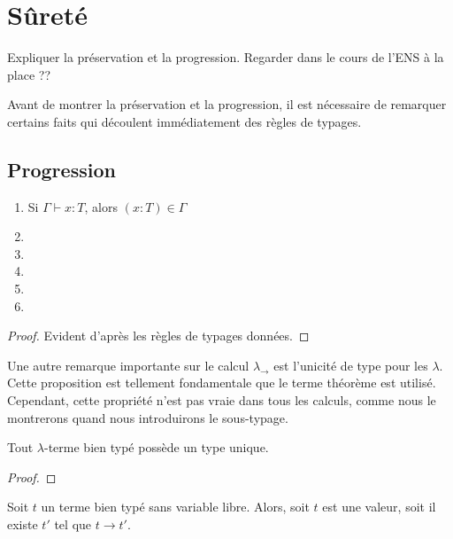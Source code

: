 \section{Sûreté}

Expliquer la préservation et la progression.
Regarder dans le cours de l'ENS à la place ??

Avant de montrer la préservation et la progression, il est nécessaire de
remarquer certains faits qui découlent immédiatement des règles de typages.

\subsection*{Progression}

\begin{lemma} 
  \begin{enumerate}
    \item Si $\Gamma \vdash x : T$, alors $(x : T) \in \Gamma$
    \item 
    \item 
    \item 
    \item 
    \item 
  \end{enumerate}
\end{lemma}
  
\begin{proof}
  Evident d'après les règles de typages données.
\end{proof}

Une autre remarque importante sur le calcul $\lambda_{\rightarrow}$ est
l'unicité de type pour les $\lambda$. Cette proposition est tellement
fondamentale que le terme théorème est utilisé. Cependant, cette propriété n'est
pas vraie dans tous les calculs, comme nous le montrerons quand nous
introduirons le sous-typage.

\begin{theorem}
  Tout $\lambda$-terme bien typé possède un type unique.
\end{theorem}

\begin{proof}
  
\end{proof}

\begin{theorem} 
  Soit $t$ un terme bien typé sans variable libre. Alors, soit $t$ est une
  valeur, soit il existe $t'$ tel que $t \rightarrow t'$.
\end{theorem}

